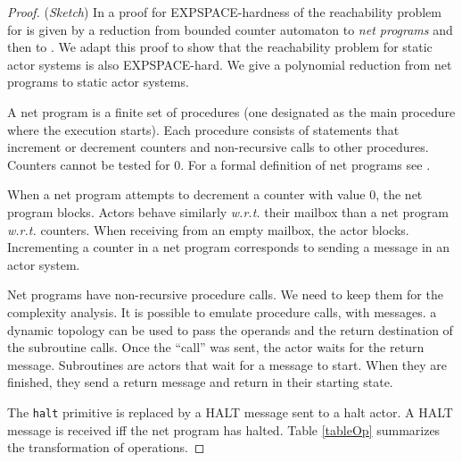 \documentclass[a4paper]{report}
\numberwithin{algorithm}{chapter}
\begin{document}
\begin{proof} (\textit{Sketch})
In \cite{Lipton76,DBLP:conf/ac/Esparza96} a proof for EXPSPACE-hardness of the reachability problem for \pns{} is given by a reduction from bounded counter automaton to \emph{net programs} and then to \pns{}.
We adapt this proof to show that the reachability problem for static actor systems is also EXPSPACE-hard.
We give a polynomial reduction from net programs to static actor systems.

A net program is a finite set of procedures (one designated as the main procedure where the execution starts).
Each procedure consists of statements that increment or decrement counters and non-recursive calls to other procedures.
Counters cannot be tested for 0.
For a formal definition of net programs see \cite{Lipton76,DBLP:conf/ac/Esparza96}.

When a net program attempts to decrement a counter with value 0, the net program blocks.
Actors behave similarly \emph{w.r.t.} their mailbox than a net program \emph{w.r.t.} counters.
When receiving from an empty mailbox, the actor blocks.
Incrementing a counter in a net program corresponds to sending a message in an actor system.

Net programs have non-recursive procedure calls.
We need to keep them for the complexity analysis.
It is possible to emulate procedure calls, with messages.
a dynamic topology can be used to pass the operands and the return destination of the subroutine calls.
Once the ``call'' was sent, the actor waits for the return message.
Subroutines are actors that wait for a message to start.
When they are finished, they send a return message and return in their starting state.

The \texttt{halt} primitive is replaced by a HALT message sent to a halt actor.
A HALT message is received iff the net program has halted.
Table \ref{tableOp} summarizes the transformation of operations.
\end{proof}
\end{document}
